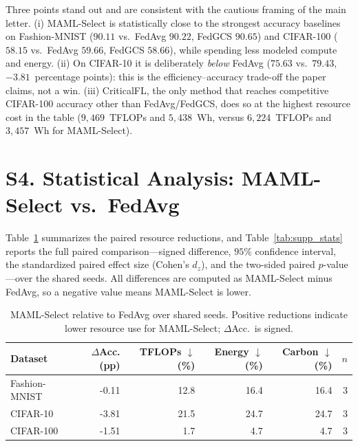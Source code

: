 \documentclass[10pt]{article}
\newcommand{\pp}{percentage points}
\begin{document}
Three points stand out and are consistent with the cautious framing of the main letter. (i) MAML-Select is statistically close to the strongest accuracy baselines on Fashion-MNIST ($90.11$ vs.\ FedAvg $90.22$, FedGCS $90.65$) and CIFAR-100 ($58.15$ vs.\ FedAvg $59.66$, FedGCS $58.66$), while spending less modeled compute and energy. (ii) On CIFAR-10 it is deliberately \emph{below} FedAvg ($75.63$ vs.\ $79.43$, $-3.81$~\pp): this is the efficiency--accuracy trade-off the paper claims, not a win. (iii) CriticalFL, the only method that reaches competitive CIFAR-100 accuracy other than FedAvg/FedGCS, does so at the highest resource cost in the table ($9{,}469$~TFLOPs and $5{,}438$~Wh, versus $6{,}224$~TFLOPs and $3{,}457$~Wh for MAML-Select).

\section*{S4. Statistical Analysis: MAML-Select vs.\ FedAvg}

Table~\ref{tab:supp_maml_vs_fedavg} summarizes the paired resource reductions, and Table~\ref{tab:supp_stats} reports the full paired comparison---signed difference, $95\%$ confidence interval, the standardized paired effect size (Cohen's $d_z$), and the two-sided paired $p$-value---over the shared seeds. All differences are computed as MAML-Select minus FedAvg, so a negative value means MAML-Select is lower.

\begin{table}[!ht]
\centering
\caption{MAML-Select relative to FedAvg over shared seeds. Positive reductions indicate lower resource use for MAML-Select; $\Delta$Acc.\ is signed.}
\label{tab:supp_maml_vs_fedavg}
\small
\begin{tabular}{@{}lrrrrr@{}}
\toprule
Dataset & $\Delta$Acc. (pp) & TFLOPs $\downarrow$ (\%) & Energy $\downarrow$ (\%) & Carbon $\downarrow$ (\%) & $n$ \\
\midrule
Fashion-MNIST & -0.11 & 12.8 & 16.4 & 16.4 & 3 \\
CIFAR-10 & -3.81 & 21.5 & 24.7 & 24.7 & 3 \\
CIFAR-100 & -1.51 & 1.7 & 4.7 & 4.7 & 3 \\
\bottomrule
\end{tabular}
\end{table}
\end{document}
